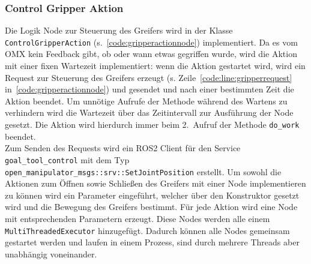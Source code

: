 \subsubsection{Control Gripper Aktion}
Die Logik Node zur Steuerung des Greifers wird in der Klasse \verb|ControlGripperAction| (s.~\ref{code:gripperactionnode}) implementiert.
Da es vom OMX kein Feedback gibt, ob oder wann etwas gegriffen wurde, wird die Aktion mit einer fixen Wartezeit implementiert: wenn die Aktion gestartet wird, wird ein Request zur Steuerung des Greifers erzeugt (s. Zeile~\ref{code:line:gripperrequest} in~\ref{code:gripperactionnode}) und gesendet und nach einer bestimmten Zeit die Aktion beendet.
Um unnötige Aufrufe der Methode während des Wartens zu verhindern wird die Wartezeit über das Zeitintervall zur Ausführung der Node gesetzt.
Die Aktion wird hierdurch immer beim 2.\ Aufruf der Methode \verb|do_work| beendet.\\
Zum Senden des Requests wird ein \ac{ROS2} Client für den Service \verb|goal_tool_control| mit dem Typ \verb|open_manipulator_msgs::srv::SetJointPosition| erstellt. 
Um sowohl die Aktionen zum Öffnen sowie Schließen des Greifers mit einer Node implementieren zu können wird ein Parameter eingeführt, welcher über den Konstruktor gesetzt wird und die Bewegung des Greifers bestimmt.
Für jede Aktion wird eine Node mit entsprechenden Parametern erzeugt.
Diese Nodes werden alle einem \verb|MultiThreadedExecutor| hinzugefügt. Dadurch können alle Nodes gemeinsam gestartet werden und laufen in einem Prozess, sind durch mehrere Threads aber unabhängig voneinander.

